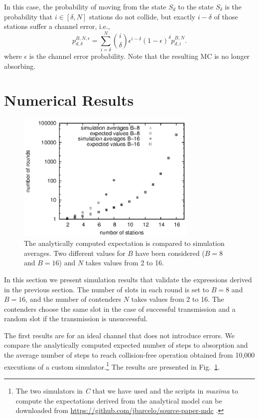 \documentclass[journal]{IEEEtran}
\begin{document}
In this case, the probability of moving from the state $S_d$ to the state $S_\delta$ is the probability that $i \in \left[ \delta, N\right]$ stations do not collide, but exactly $i-\delta$ of those stations suffer a channel error, i.e.,
\begin{equation}
\label{eq:psiBNepsilon}
p^{B,N,\epsilon}_{d,\delta} = \sum_{i=\delta}^{N} \binom{i}{\delta} \epsilon^{i-\delta}(1-\epsilon)^\delta p^{B,N}_{d,i}.
\end{equation}
where $\epsilon$ is the channel error probability. Note that the resulting MC is no longer absorbing.

\section{Numerical Results}
\label{sec:numerical_results}

\begin{figure}
\centering
\includegraphics[height=6.2cm]{figures/convergence_avg}
\caption{The analytically computed expectation is compared to simulation averages. Two different values for $B$ have been considered ($B=8$ and $B=16$) and $N$ takes values from 2 to 16.}
\label{fig:convergence_avg}
\end{figure}


In this section we present simulation results that validate the expressions derived in the previous section.
The number of slots in each round is set to $B=8$ and $B=16$, and the number of contenders $N$ takes values from 2 to 16.
The contenders choose the same slot in the case of successful transmission and a random slot if the transmission is unsuccessful.

The first results are for an ideal channel that does not introduce errors.
We compare the analytically computed expected number of steps to absorption and the average number of steps to reach collision-free operation obtained from 10,000 executions of a custom simulator.\footnote{The two simulators in \emph{C} that we have used and the scripts in \emph{maxima} to compute the expectations derived from the analytical model can be downloaded from \url{https://github.com/jbarcelo/source-paper-mdc} .}
The results are presented in Fig.~\ref{fig:convergence_avg}.
\end{document}
